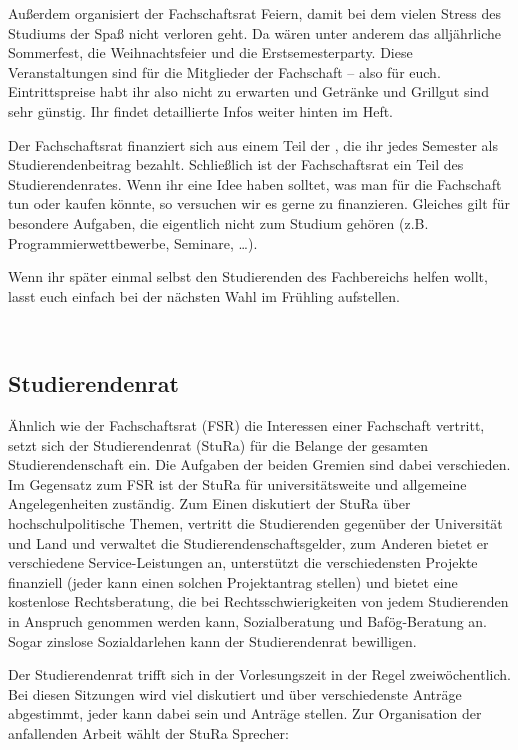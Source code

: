 Außerdem organisiert der Fachschaftsrat Feiern, damit bei dem vielen Stress des Studiums der Spaß nicht verloren geht.
Da wären unter anderem das alljährliche Sommerfest, die Weihnachtsfeier und die Erstsemesterparty.
Diese Veranstaltungen sind für die Mitglieder der Fachschaft -- also für euch.
Eintrittspreise habt ihr also nicht zu erwarten und Getränke und Grillgut sind sehr günstig.
Ihr findet detaillierte Infos weiter hinten im Heft.

Der Fachschaftsrat finanziert sich aus einem Teil der , die ihr jedes Semester als Studierendenbeitrag bezahlt.
Schließlich ist der Fachschaftsrat ein Teil des Studierendenrates.
Wenn ihr eine Idee haben solltet, was man für die Fachschaft tun oder kaufen könnte, so versuchen wir es gerne zu finanzieren.
Gleiches gilt für besondere Aufgaben, die eigentlich nicht zum Studium gehören (\;z.B. Programmierwettbewerbe, Seminare, \ldots).

Wenn ihr später einmal selbst den Studierenden des Fachbereichs helfen wollt, lasst euch einfach bei der nächsten Wahl im Frühling aufstellen.

\\

\subsection{Studierendenrat}

Ähnlich wie der Fachschaftsrat (FSR) die Interessen einer Fachschaft vertritt, setzt sich der Studierendenrat (StuRa) für die Belange der gesamten Studierendenschaft ein.
Die Aufgaben der beiden Gremien sind dabei verschieden.
Im Gegensatz zum FSR ist der StuRa für universitätsweite und allgemeine Angelegenheiten zuständig.
Zum Einen diskutiert der StuRa über hochschulpolitische Themen,  vertritt die Studierenden gegenüber der Universität und Land und verwaltet die Studierendenschaftsgelder, zum Anderen bietet er verschiedene Service-Leistungen an, unterstützt die verschiedensten Projekte finanziell (jeder kann einen solchen Projektantrag stellen) und bietet eine kostenlose Rechtsberatung, die bei Rechtsschwierigkeiten von jedem Studierenden in Anspruch genommen werden kann, Sozialberatung und Bafög-Beratung an.
Sogar zinslose Sozialdarlehen kann der Studierendenrat bewilligen.

Der Studierendenrat trifft sich in der Vorlesungszeit in der Regel zweiwöchentlich.
Bei diesen Sitzungen wird viel diskutiert und über verschiedenste Anträge abgestimmt, jeder kann dabei sein und Anträge stellen.
Zur Organisation der anfallenden Arbeit wählt der StuRa Sprecher:


